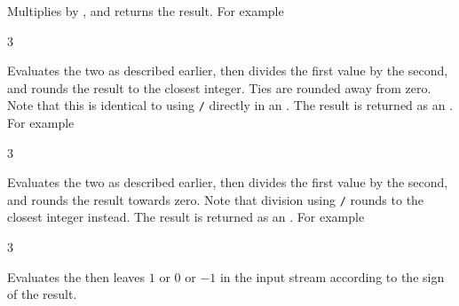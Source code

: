 \documentclass[oneside]{book}
\begin{document}
\begin{function}{\IntMathMult}
\begin{syntax}
  
\end{syntax}
Multiplies  by ,
and returns the result. For example
\begin{demohigh}
 {3}
\end{demohigh}
\end{function}

\begin{function}{\IntMathDiv}
\begin{syntax}
  
\end{syntax}
Evaluates the two  as described earlier,
then divides the first value by the second, and rounds the result
to the closest integer. Ties are rounded away from zero. Note that
this is identical to using \verb|/| directly in an .
The result is returned as an .
For example
\begin{demohigh}
 {3}
\end{demohigh}
\end{function}

\begin{function}{\IntMathDivTrancate}
\begin{syntax}
  
\end{syntax}
Evaluates the two  as described earlier,
then divides the first value by the second, and rounds the result towards zero.
Note that division using \verb|/| rounds to the closest integer instead.
The result is returned as an .
For example
\begin{demohigh}
 {3}
\end{demohigh}
\end{function}

\begin{function}{\IntMathSign}
\begin{syntax}
 
\end{syntax}
Evaluates the  then leaves $1$ or $0$ or
$-1$ in the input stream according to the sign of the result.
\end{function}
\end{document}
